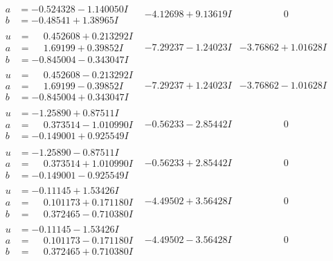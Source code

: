 \documentclass[1p]{elsarticle_modified}
\theoremstyle{definition}
\begin{document}
$$\begin{array}{c|c|c}
\begin{aligned}
a &= -0.524328 - 1.140050 I \\
b &= -0.48541 + 1.38965 I\end{aligned}
 & -4.12698 + 9.13619 I & \phantom{-0.000000 } 0 \\ \hline\begin{aligned}
u &= \phantom{-}0.452608 + 0.213292 I \\
a &= \phantom{-}1.69199 + 0.39852 I \\
b &= -0.845004 - 0.343047 I\end{aligned}
 & -7.29237 - 1.24023 I & -3.76862 + 1.01628 I \\ \hline\begin{aligned}
u &= \phantom{-}0.452608 - 0.213292 I \\
a &= \phantom{-}1.69199 - 0.39852 I \\
b &= -0.845004 + 0.343047 I\end{aligned}
 & -7.29237 + 1.24023 I & -3.76862 - 1.01628 I \\ \hline\begin{aligned}
u &= -1.25890 + 0.87511 I \\
a &= \phantom{-}0.373514 - 1.010990 I \\
b &= -0.149001 + 0.925549 I\end{aligned}
 & -0.56233 - 2.85442 I & \phantom{-0.000000 } 0 \\ \hline\begin{aligned}
u &= -1.25890 - 0.87511 I \\
a &= \phantom{-}0.373514 + 1.010990 I \\
b &= -0.149001 - 0.925549 I\end{aligned}
 & -0.56233 + 2.85442 I & \phantom{-0.000000 } 0 \\ \hline\begin{aligned}
u &= -0.11145 + 1.53426 I \\
a &= \phantom{-}0.101173 + 0.171180 I \\
b &= \phantom{-}0.372465 - 0.710380 I\end{aligned}
 & -4.49502 + 3.56428 I & \phantom{-0.000000 } 0 \\ \hline\begin{aligned}
u &= -0.11145 - 1.53426 I \\
a &= \phantom{-}0.101173 - 0.171180 I \\
b &= \phantom{-}0.372465 + 0.710380 I\end{aligned}
 & -4.49502 - 3.56428 I & \phantom{-0.000000 } 0 \\ \hline\begin{aligned}

\end{aligned}
\end{array}$$
\end{document}
